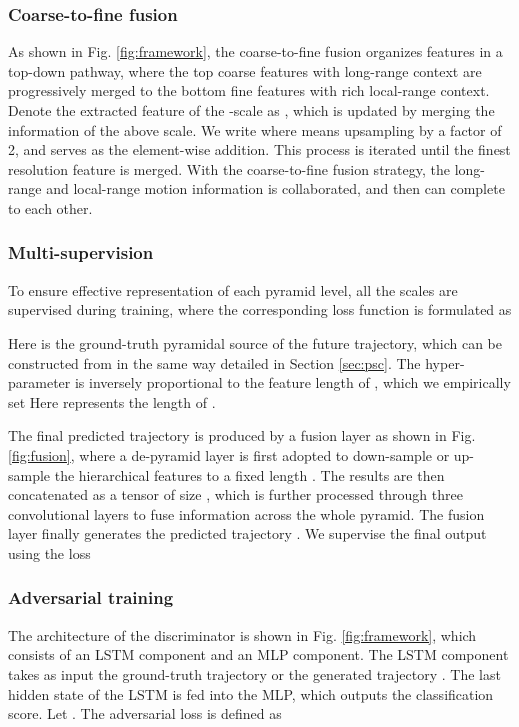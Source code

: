 \documentclass[letterpaper]{article} \usepackage{aaai21}  \usepackage{times}  \usepackage{helvet} \usepackage{courier}  \usepackage[hyphens]{url}  \usepackage{graphicx} \urlstyle{rm} \def\UrlFont{\rm}  \usepackage{natbib}  \usepackage{caption} \frenchspacing  \setlength{\pdfpagewidth}{8.5in}  \setlength{\pdfpageheight}{11in}
\begin{document}
\subsubsection{Coarse-to-fine fusion}
As shown in Fig. \ref{fig:framework}, the coarse-to-fine fusion organizes features in a top-down pathway, where the top coarse features with long-range context are progressively merged to the bottom fine features with rich local-range context.  Denote the extracted feature of the -scale as , which is updated by merging the information of the above scale. We write
 where  means upsampling  by a factor of 2, and  serves as the element-wise addition. This process is iterated until the finest resolution feature is merged. With the coarse-to-fine fusion strategy, the long-range and local-range motion information is collaborated, and then can complete to each other.

\subsubsection{Multi-supervision}
To ensure effective representation of each pyramid level, all the scales are supervised during training, where the corresponding loss function is formulated as 
 
Here  is the ground-truth pyramidal source of the future trajectory, which can be constructed from  in the same way detailed in Section \ref{sec:psc}. The hyper-parameter  is inversely proportional to the feature length of , which we empirically set
Here  represents the length of .


The final predicted trajectory is produced by a fusion layer as shown in Fig. \ref{fig:fusion}, where a de-pyramid layer is first adopted to down-sample or up-sample the hierarchical features  to a fixed length . The results are then concatenated as a tensor of size , which is further processed through three convolutional layers to fuse information across the whole pyramid. The fusion layer finally generates the predicted trajectory . We supervise the final output using the loss


\subsubsection{Adversarial training}
The architecture of the discriminator is shown in Fig. \ref{fig:framework}, which consists of an LSTM component and an MLP component. 
The LSTM component takes as input the ground-truth trajectory  or the generated trajectory . The last hidden state of the LSTM is fed into the MLP, which outputs the classification score. Let . The adversarial loss is defined as
\end{document}
